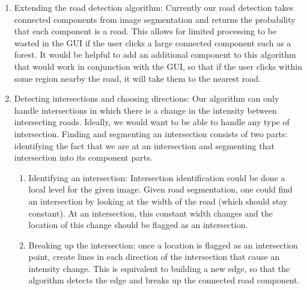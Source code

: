 \documentclass[12pt]{article}
\begin{document}
\begin{enumerate}
\item Extending the road detection algorithm: Currently our road detection takes connected components from image segmentation and returns the probability that each component is a road. This allows for limited processing to be wasted in the GUI if the user clicks a large connected component such as a forest. It would be helpful to add an additional component to this algorithm that would work in conjunction with the GUI, so that if the user clicks within some region nearby the road, it will take them to the nearest road. 
\item Detecting intersections and choosing directions: Our algorithm can only handle intersections in which there is a change in the intensity between intersecting roads. Ideally, we would want to be able to handle any type of intersection. Finding and segmenting an intersection consists of two parts: identifying the fact that we are at an intersection and segmenting that intersection into its component parts. 
	\begin{enumerate}
	\item Identifying an intersection: Intersection identification could be done a local level for the given image. Given road segmentation, one could find an intersection by looking at the width of the road (which should stay constant). At an intersection, this constant width changes and the location of this change should be flagged as an intersection. 
	\item Breaking up the intersection: once a location is flagged as an intersection point, create lines in each direction of the intersection that cause an intensity change. This is equivalent to building a new edge, so that the algorithm detects the edge and breaks up the connected road component.  
	\end{enumerate} 
\end{enumerate}
\end{document}
